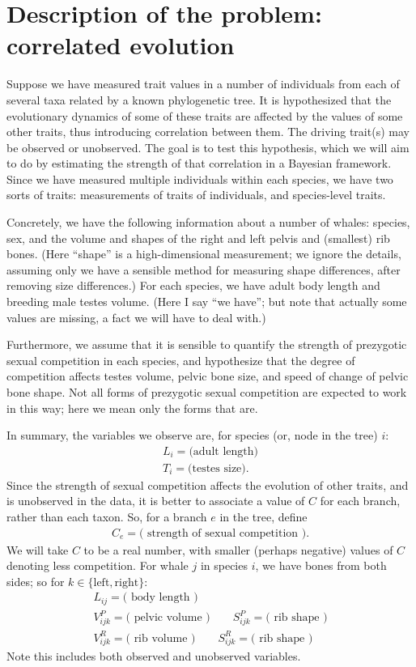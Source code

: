 \documentclass{article}
\begin{document}
\section{Description of the problem: correlated evolution}

Suppose we have measured trait values in a number of individuals from each of several taxa related by a known phylogenetic tree.
It is hypothesized that the evolutionary dynamics of some of these traits
are affected by the values of some other traits,
thus introducing correlation between them.
The driving trait(s) may be observed or unobserved.
The goal is to test this hypothesis,
which we will aim to do by estimating the strength of that correlation
in a Bayesian framework.
Since we have measured multiple individuals within each species,
we have two sorts of traits:
measurements of traits of individuals, 
and species-level traits.

Concretely, we have the following information about a number of whales:
species, sex,
and the volume and shapes of the right and left pelvis and (smallest) rib bones.
(Here ``shape'' is a high-dimensional measurement;
we ignore the details, assuming only we have a sensible method for measuring shape differences,
after removing size differences.)
For each species, we have
adult body length and
breeding male testes volume.
(Here I say ``we have''; but note that actually some values are missing,
a fact we will have to deal with.)

Furthermore, we assume that it is sensible to quantify the strength of prezygotic sexual competition in each species,
and hypothesize that the degree of competition affects testes volume, pelvic bone size, and speed of change of pelvic bone shape.
Not all forms of prezygotic sexual competition are expected to work in this way;
here we mean only the forms that are.

In summary, the variables we observe are, for species (or, node in the tree) $i$:
\begin{gather*}
    L_i = \text{(adult length)} \\
    T_i = \text{(testes size)} .
\end{gather*}
Since the strength of sexual competition affects the evolution of other traits,
and is unobserved in the data,
it is better to associate a value of $C$ for each branch, rather than each taxon.
So, for a branch $e$ in the tree, define
\begin{gather*}
    C_{e} = \text{( strength of sexual competition )}  .
\end{gather*}
We will take $C$ to be a real number, with smaller (perhaps negative) values of $C$ denoting less competition.
For whale $j$ in species $i$, we have bones from both sides; so for $k \in \{\text{left},\text{right}\}$:
\begin{gather*}
    L_{ij} = \text{( body length )} \\
    V^P_{ijk} = \text{( pelvic volume )} \qquad S^P_{ijk} = \text{( rib shape )} \\
    V^R_{ijk} = \text{( rib volume )} \qquad S^R_{ijk} = \text{( rib shape )} 
\end{gather*}
Note this includes both observed and unobserved variables.
\end{document}
